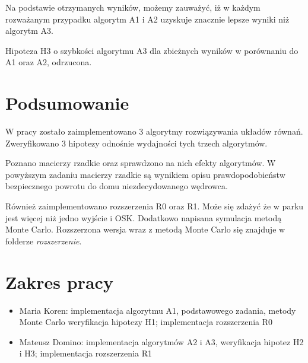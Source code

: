 \documentclass[12pt,a4paper]{article}
\begin{document}
Na podstawie otrzymanych wyników, możemy zauważyć, iż w każdym rozważanym przypadku algorytm A1 i A2 uzyskuje znacznie lepsze wyniki niż algorytm A3.

Hipoteza H3 o szybkości algorytmu A3 dla zbieżnych wyników w porównaniu do A1 oraz A2, odrzucona.

\newpage

\section{Podsumowanie}
W pracy zostało zaimplementowano 3 algorytmy rozwiązywania układów równań. Zweryfikowano 3 hipotezy odnośnie wydajności tych trzech algorytmów.

Poznano macierzy rzadkie oraz sprawdzono na nich efekty algorytmów.
W powyższym zadaniu macierzy rzadkie są wynikiem opisu prawdopodobieństw bezpiecznego powrotu do domu niezdecydowanego wędrowca.

Również zaimplementowano rozszerzenia R0 oraz R1. Może się zdażyć że w parku jest więcej niż jedno wyjście i OSK. Dodatkowo napisana symulacja metodą Monte Carlo. Rozszerzona wersja wraz z metodą Monte Carlo się znajduje w folderze \textit{rozszerzenie}.

\newpage
\section{Zakres pracy}
\begin{itemize}
    \item Maria Koren: implementacja algorytmu A1, podstawowego zadania, metody Monte Carlo weryfikacja hipotezy H1; implementacja rozszerzenia R0
    \item Mateusz Domino: implementacja algorytmów A2 i A3, weryfikacja hipotez H2 i H3;  implementacja rozszerzenia R1
\end{itemize}
\end{document}
